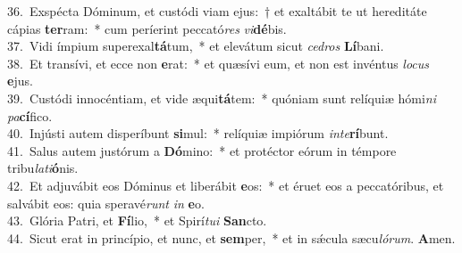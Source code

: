 {36.~}Exspécta Dóminum, et custódi viam ejus:~† et exaltábit te ut hereditáte cápias \textbf{ter}ram:~* cum períerint peccató\textit{res} \textit{vi}\textbf{dé}bis.\\
{37.~}Vidi ímpium superexal\textbf{tá}tum,~* et elevátum sicut \textit{ce}\textit{dros} \textbf{Lí}bani.\\
{38.~}Et transívi, et ecce non \textbf{e}rat:~* et quæsívi eum, et non est invéntus \textit{lo}\textit{cus} \textbf{e}jus.\\
{39.~}Custódi innocéntiam, et vide æqui\textbf{tá}tem:~* quóniam sunt relíquiæ hómi\textit{ni} \textit{pa}\textbf{cí}fico.\\
{40.~}Injústi autem disperíbunt \textbf{si}mul:~* relíquiæ impiórum \textit{in}\textit{te}\textbf{rí}bunt.\\
{41.~}Salus autem justórum a \textbf{Dó}mino:~* et protéctor eórum in témpore tribu\textit{la}\textit{ti}\textbf{ó}nis.\\
{42.~}Et adjuvábit eos Dóminus et liberábit \textbf{e}os:~* et éruet eos a peccatóribus, et salvábit eos: quia speravé\textit{runt} \textit{in} \textbf{e}o.\\
{43.~}Glória Patri, et \textbf{Fí}lio,~* et Spirí\textit{tu}\textit{i} \textbf{San}cto.\\
{44.~}Sicut erat in princípio, et nunc, et \textbf{sem}per,~* et in sǽcula sæcu\textit{ló}\textit{rum}. \textbf{A}men.\\
